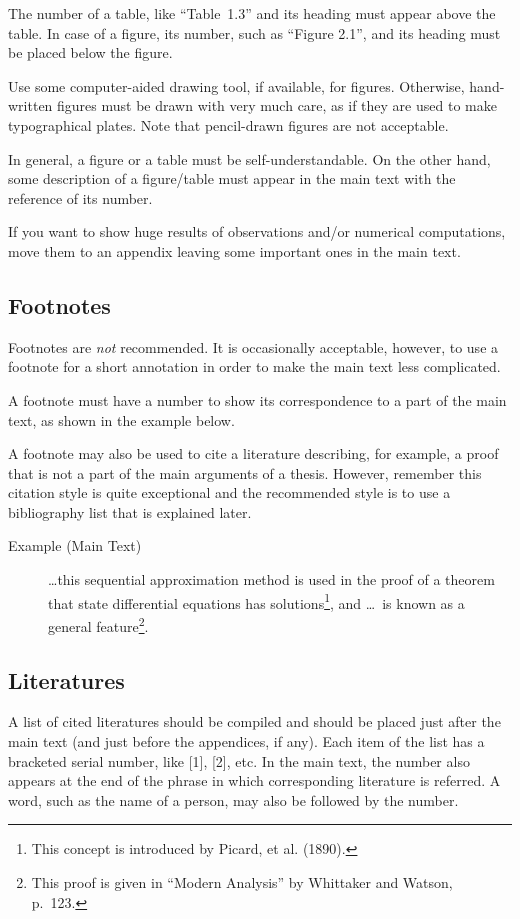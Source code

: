 The number of a table, like ``Table~1.3'' and its heading must appear above
the table.  In case of a figure, its number, such as ``Figure 2.1'', and its
heading must be placed below the figure.

Use some computer-aided drawing tool, if available, for figures.  Otherwise,
hand-written figures must be drawn with very much care, as if they are used
to make typographical plates.  Note that pencil-drawn figures are not
acceptable.

In general, a figure or a table must be self-understandable.  On the other
hand, some description of a figure/table must appear in the main text with
the reference of its number.

If you want to show huge results of observations and/or numerical
computations, move them to an appendix leaving some important ones in the
main text.

\subsection{Footnotes}\label{subsec-footnote}
Footnotes are {\em not} recommended.  It is occasionally acceptable,
however, to use a footnote for a short annotation in order to make the main
text less complicated.

A footnote must have a number to show its correspondence to a part of the
main text, as shown in the example below.

A footnote may also be used to cite a literature describing, for example, a
proof that is not a part of the main arguments of a thesis.  However,
remember this citation style is quite exceptional and the recommended style
is to use a bibliography list that is explained later.

\begin{description}
\item[Example {\rm(Main Text)}]\leavevmode\par
\ldots this sequential approximation method is used in the proof of a theorem
that state differential equations has solutions\footnote{This concept is
introduced by Picard, et al. (1890).}, and \ldots\ is known as a general
feature\footnote{This proof is given in ``Modern Analysis'' by Whittaker and
Watson, p.~123.}.
\end{description}

\subsection{Literatures}\label{subsec-references}
A list of cited literatures should be compiled and should be placed just
after the main text (and just before the appendices, if any).  Each item of
the list has a bracketed serial number, like [1], [2], etc.  In the main
text, the number also appears at the end of the phrase in which
corresponding literature is referred.  A word, such as the name of a person,
may also be followed by the number.

